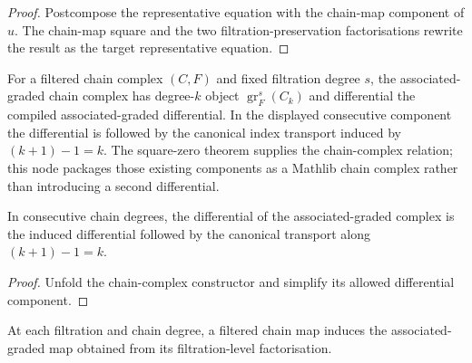\begin{proof}
  \leanok
  Postcompose the representative equation with the chain-map component of
  $u$.  The chain-map square and the two filtration-preservation
  factorisations rewrite the result as the target representative equation.
\end{proof}

\begin{definition}
  \label{def:filtered-associated-graded-complex}
  \leanok
  For a filtered chain complex $(C,F)$ and fixed filtration degree $s$, the
  associated-graded chain complex has degree-$k$ object
  $\operatorname{gr}^s_F(C_k)$ and differential the compiled
  associated-graded differential.  In the displayed consecutive component the
  differential is followed by the canonical index transport induced by
  $(k+1)-1=k$.  The square-zero theorem supplies the chain-complex
  relation; this node packages those existing components as a Mathlib chain
  complex rather than introducing a second differential.
\end{definition}

\begin{theorem}
  \label{thm:filtered-associated-graded-complex-d}
  \leanok
  In consecutive chain degrees, the differential of the associated-graded
  complex is the induced differential followed by the canonical transport
  along $(k+1)-1=k$.
\end{theorem}

\begin{proof}
  \leanok
  Unfold the chain-complex constructor and simplify its allowed differential
  component.
\end{proof}

\begin{definition}
  \label{def:filtered-associated-graded-map}
  \leanok
  At each filtration and chain degree, a filtered chain map induces the
  associated-graded map obtained from its filtration-level factorisation.
\end{definition}

